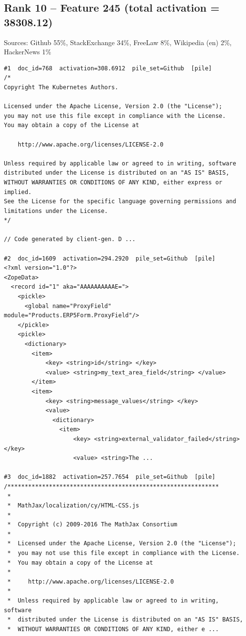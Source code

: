 \subsection*{Rank 10 -- Feature 245 (total activation = 38308.12)}

Sources: Github 55\%, StackExchange 34\%, FreeLaw 8\%, Wikipedia (en) 2\%, HackerNews 1\%

\begin{verbatim}
#1  doc_id=768  activation=308.6912  pile_set=Github  [pile]
/*
Copyright The Kubernetes Authors.

Licensed under the Apache License, Version 2.0 (the "License");
you may not use this file except in compliance with the License.
You may obtain a copy of the License at

    http://www.apache.org/licenses/LICENSE-2.0

Unless required by applicable law or agreed to in writing, software
distributed under the License is distributed on an "AS IS" BASIS,
WITHOUT WARRANTIES OR CONDITIONS OF ANY KIND, either express or implied.
See the License for the specific language governing permissions and
limitations under the License.
*/

// Code generated by client-gen. D ...

#2  doc_id=1609  activation=294.2920  pile_set=Github  [pile]
<?xml version="1.0"?>
<ZopeData>
  <record id="1" aka="AAAAAAAAAAE=">
    <pickle>
      <global name="ProxyField" module="Products.ERP5Form.ProxyField"/>
    </pickle>
    <pickle>
      <dictionary>
        <item>
            <key> <string>id</string> </key>
            <value> <string>my_text_area_field</string> </value>
        </item>
        <item>
            <key> <string>message_values</string> </key>
            <value>
              <dictionary>
                <item>
                    <key> <string>external_validator_failed</string> </key>
                    <value> <string>The ...

#3  doc_id=1882  activation=257.7654  pile_set=Github  [pile]
/*************************************************************
 *
 *  MathJax/localization/cy/HTML-CSS.js
 *
 *  Copyright (c) 2009-2016 The MathJax Consortium
 *
 *  Licensed under the Apache License, Version 2.0 (the "License");
 *  you may not use this file except in compliance with the License.
 *  You may obtain a copy of the License at
 *
 *     http://www.apache.org/licenses/LICENSE-2.0
 *
 *  Unless required by applicable law or agreed to in writing, software
 *  distributed under the License is distributed on an "AS IS" BASIS,
 *  WITHOUT WARRANTIES OR CONDITIONS OF ANY KIND, either e ...


\end{verbatim}
